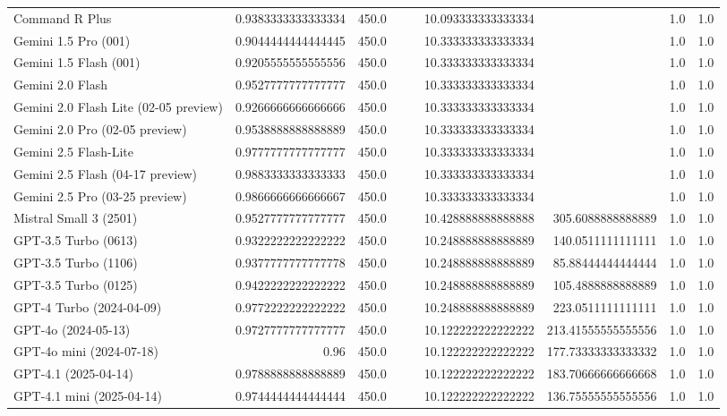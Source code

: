 \begin{table}[htp]
{\begin{tabular}{lrrrrrrrr}
Command R Plus & 0.9383333333333334 & 450.0 &  &  & 10.093333333333334 &  & 1.0 & 1.0 \\
Gemini 1.5 Pro (001) & 0.9044444444444445 & 450.0 &  &  & 10.333333333333334 &  & 1.0 & 1.0 \\
Gemini 1.5 Flash (001) & 0.9205555555555556 & 450.0 &  &  & 10.333333333333334 &  & 1.0 & 1.0 \\
Gemini 2.0 Flash & 0.9527777777777777 & 450.0 &  &  & 10.333333333333334 &  & 1.0 & 1.0 \\
Gemini 2.0 Flash Lite (02-05 preview) & 0.9266666666666666 & 450.0 &  &  & 10.333333333333334 &  & 1.0 & 1.0 \\
Gemini 2.0 Pro (02-05 preview) & 0.9538888888888889 & 450.0 &  &  & 10.333333333333334 &  & 1.0 & 1.0 \\
Gemini 2.5 Flash-Lite & 0.9777777777777777 & 450.0 &  &  & 10.333333333333334 &  & 1.0 & 1.0 \\
Gemini 2.5 Flash (04-17 preview) & 0.9883333333333333 & 450.0 &  &  & 10.333333333333334 &  & 1.0 & 1.0 \\
Gemini 2.5 Pro (03-25 preview) & 0.9866666666666667 & 450.0 &  &  & 10.333333333333334 &  & 1.0 & 1.0 \\
Mistral Small 3 (2501) & 0.9527777777777777 & 450.0 &  &  & 10.428888888888888 & 305.6088888888889 & 1.0 & 1.0 \\
GPT-3.5 Turbo (0613) & 0.9322222222222222 & 450.0 &  &  & 10.248888888888889 & 140.0511111111111 & 1.0 & 1.0 \\
GPT-3.5 Turbo (1106) & 0.9377777777777778 & 450.0 &  &  & 10.248888888888889 & 85.88444444444444 & 1.0 & 1.0 \\
GPT-3.5 Turbo (0125) & 0.9422222222222222 & 450.0 &  &  & 10.248888888888889 & 105.4888888888889 & 1.0 & 1.0 \\
GPT-4 Turbo (2024-04-09) & 0.9772222222222222 & 450.0 &  &  & 10.248888888888889 & 223.0511111111111 & 1.0 & 1.0 \\
GPT-4o (2024-05-13) & 0.9727777777777777 & 450.0 &  &  & 10.122222222222222 & 213.41555555555556 & 1.0 & 1.0 \\
GPT-4o mini (2024-07-18) & 0.96 & 450.0 &  &  & 10.122222222222222 & 177.73333333333332 & 1.0 & 1.0 \\
GPT-4.1 (2025-04-14) & 0.9788888888888889 & 450.0 &  &  & 10.122222222222222 & 183.70666666666668 & 1.0 & 1.0 \\
GPT-4.1 mini (2025-04-14) & 0.9744444444444444 & 450.0 &  &  & 10.122222222222222 & 136.75555555555556 & 1.0 & 1.0 \\

\end{tabular}}
\end{table}
